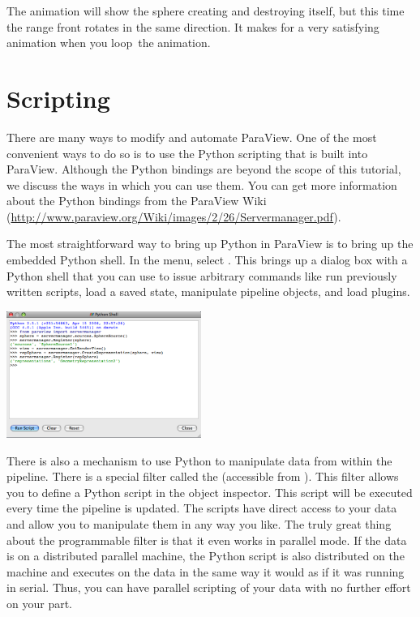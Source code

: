 The animation will show the sphere creating and destroying itself, but this
time the range front rotates in the same direction.  It makes for a very
satisfying animation when you loop~\vcrLoop the animation.


\section{Scripting}

There are many ways to modify and automate ParaView.  One of the most
convenient ways to do so is to use the Python scripting that is built into
ParaView.  Although the Python bindings are beyond the scope of this
tutorial, we discuss the ways in which you can use them.  You can get more
information about the Python bindings from the ParaView Wiki
(\href{http://www.paraview.org/Wiki/images/2/26/Servermanager.pdf}{http://www.paraview.org/Wiki/images/2/26/Servermanager.pdf}).

The most straightforward way to bring up Python in ParaView is to bring up
the embedded Python shell.  In the menu, select  \ra {}.  This brings up a dialog box with a Python shell that you can use
to issue arbitrary commands like run previously written scripts, load a
saved state, manipulate pipeline objects, and load plugins.

\begin{inlinefig}
  \includegraphics[width=2.5in]{images/PythonShell}
\end{inlinefig}

There is also a mechanism to use Python to manipulate data from within the
pipeline.  There is a special filter called the  (accessible from  \ra {} \ra
{}).  This filter allows you to define a Python
script in the object inspector.  This script will be executed every time
the pipeline is updated.  The scripts have direct access to your data and
allow you to manipulate them in any way you like.  The truly great thing
about the programmable filter is that it even works in parallel mode.  If
the data is on a distributed parallel machine, the Python script is also
distributed on the machine and executes on the data in the same way it
would as if it was running in serial.  Thus, you can have parallel
scripting of your data with no further effort on your part.

